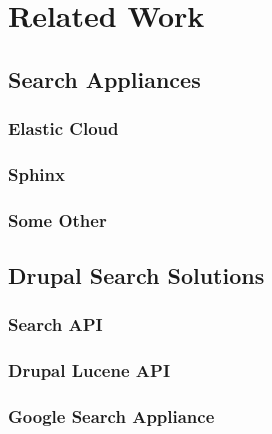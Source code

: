 \chapter{Related Work}
\section{Search Appliances}
\subsection{Elastic Cloud}
\subsection{Sphinx}
\subsection{Some Other}
\section{Drupal Search Solutions}
\subsection{Search API}
\subsection{Drupal Lucene API}
\subsection{Google Search Appliance}
